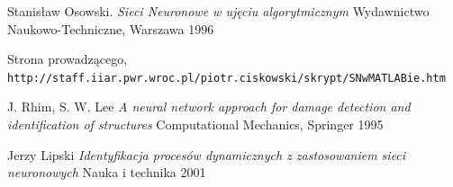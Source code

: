 \documentclass{article}
\begin{document}
\newpage
\begin{thebibliography}{9}

Stanisław Osowski.
\textit{Sieci Neuronowe w ujęciu algorytmicznym}
Wydawnictwo Naukowo-Techniczne, Warszawa 1996

Strona prowadzącego,
\\\texttt{http://staff.iiar.pwr.wroc.pl/piotr.ciskowski/skrypt/SNwMATLABie.htm}

J. Rhim, S. W. Lee
\textit{A neural network approach for damage detection and identification of structures}
Computational Mechanics, Springer 1995

Jerzy Lipski
\textit{Identyfikacja procesów dynamicznych z zastosowaniem sieci neuronowych}
Nauka i technika 2001

\end{thebibliography}
\end{document}
